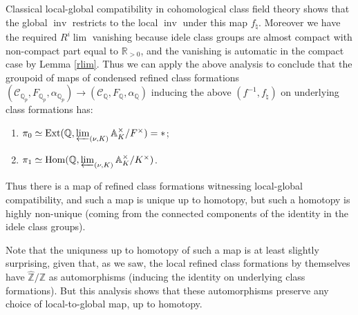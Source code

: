 \documentclass[12pt]{article}
\theoremstyle{definition}
\newcommand{\on}{\operatorname}
\newcommand{\mc}{\mathcal}
\newcommand{\mbb}{\mathbb}
\newcommand{\wh}{\widehat}
\begin{document}
Classical local-global compatibility in cohomological class field theory shows that the global $\on{inv}$ restricts to the local $\on{inv}$ under this map $f_\natural$.  Moreover we have the required $R^i\on{lim}$ vanishing because idele class groups are almost compact with non-compact part equal to $\mbb{R}_{>0}$, and the vanishing is automatic in the compact case by Lemma \ref{rlim}.  Thus we can apply the above analysis to conclude that the groupoid of maps of condensed refined class formations $(\mc{C}_{\mbb{Q}_p},F_{\mbb{Q}_p},\alpha_{\mbb{Q}_p})\to (\mc{C}_{\mbb{Q}},F_\mbb{Q},\alpha_{\mbb{Q}})$ inducing the above $(f^{-1},f_\natural)$ on underlying class formations has:
\begin{enumerate}
\item $\pi_0 \simeq \on{Ext}(\mbb{Q},\varprojlim_{(\nu,K)} \mbb{A}_K^\times / F^\times) = \ast$;
\item $\pi_1 \simeq \on{Hom}(\mbb{Q},\varprojlim_{(\nu,K)} \mbb{A}_K^\times / K^\times)$.
\end{enumerate}
Thus there is a map of refined class formations witnessing local-global compatibility, and such a map is unique up to homotopy, but such a homotopy is highly non-unique (coming from the connected components of the identity in the idele class groups).

Note that the uniquness up to homotopy of such a map is at least slightly surprising, given that, as we saw, the local refined class formations by themselves have $\wh{\mbb{Z}}/\mbb{Z}$ as automorphisms (inducing the identity on underlying class formations).  But this analysis shows that these automorphisms preserve any choice of local-to-global map, up to homotopy.
\end{document}
